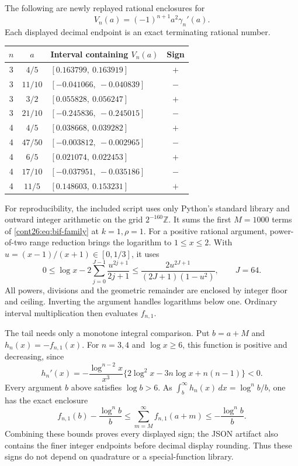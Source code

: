 \documentclass[11pt,letterpaper]{article}
\numberwithin{equation}{section}
\theoremstyle{plain}
\theoremstyle{definition}
\theoremstyle{remark}
\begin{document}
The following are newly replayed rational enclosures for
\[
 V_n(a)=(-1)^{n+1}a^2\gamma_n'(a).
\]
Each displayed decimal endpoint is an exact terminating rational number.
\begin{center}
\begin{tabular}{cclc}
\hline
$n$&$a$&Interval containing $V_n(a)$&Sign\\
\hline
3&$4/5$&$[0.163799,\ 0.163919]$&$+$\\
3&$11/10$&$[-0.041066,\ -0.040839]$&$-$\\
3&$3/2$&$[0.055828,\ 0.056247]$&$+$\\
3&$21/10$&$[-0.245836,\ -0.245015]$&$-$\\
4&$4/5$&$[0.038668,\ 0.039282]$&$+$\\
4&$47/50$&$[-0.003812,\ -0.002965]$&$-$\\
4&$6/5$&$[0.021074,\ 0.022453]$&$+$\\
4&$17/10$&$[-0.037951,\ -0.035186]$&$-$\\
4&$11/5$&$[0.148603,\ 0.153231]$&$+$\\
\hline
\end{tabular}
\end{center}

For reproducibility, the included script uses only Python's standard
library and outward integer arithmetic on the grid $2^{-160}\mathbb Z$.
It sums the first $M=1000$ terms of \eqref{cont26:eq:bif-family} at $k=1,\rho=1$.
For a positive rational argument, power-of-two range reduction brings
the logarithm to $1\leq x\leq2$. With $u=(x-1)/(x+1)\in[0,1/3]$, it uses
\begin{equation}\label{cont26:eq:bif-log-certificate}
 0\leq\log x-2\sum_{j=0}^{J-1}\frac{u^{2j+1}}{2j+1}
 \leq\frac{2u^{2J+1}}{(2J+1)(1-u^2)},\qquad J=64.
\end{equation}
All powers, divisions and the geometric remainder are enclosed by
integer floor and ceiling. Inverting the argument handles logarithms
below one. Ordinary interval multiplication then evaluates $f_{n,1}$.

The tail needs only a monotone integral comparison. Put $b=a+M$ and
$h_n(x)=-f_{n,1}(x)$. For $n=3,4$ and $\log x\geq6$, this function is
positive and decreasing, since
\[
 h_n'(x)=-\frac{\log^{n-2}x}{x^3}
          \{2\log^2x-3n\log x+n(n-1)\}<0.
\]
Every argument $b$ above satisfies $\log b>6$. As
$\int_b^\infty h_n(x)\,dx=\log^n b/b$, one has the exact enclosure
\begin{equation}\label{cont26:eq:bif-tail-certificate}
 f_{n,1}(b)-\frac{\log^n b}{b}
 \leq\sum_{m=M}^{\infty}f_{n,1}(a+m)
 \leq-\frac{\log^n b}{b}.
\end{equation}
Combining these bounds proves every displayed sign; the JSON artifact
also contains the finer integer endpoints before decimal display rounding.
Thus these signs do not depend on quadrature or a special-function library.
\end{document}

